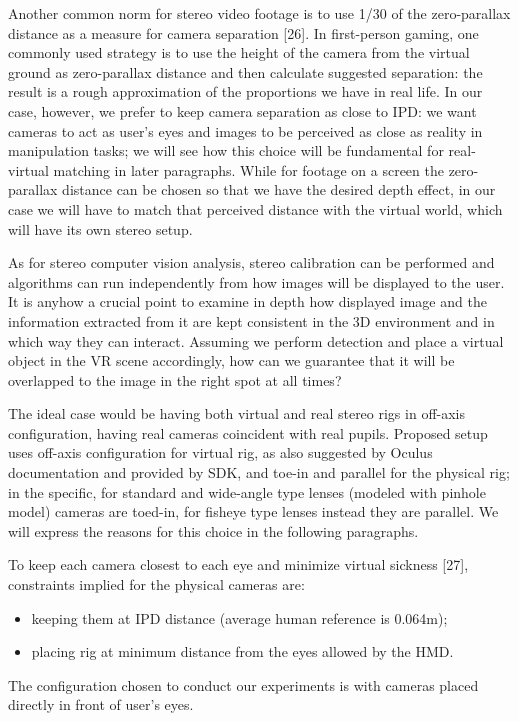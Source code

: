 Another common norm for stereo video footage is to use 1/30 of the zero-parallax distance as a measure for camera separation [26]. In first-person gaming, one commonly used strategy is to use the height of the camera from the virtual ground as zero-parallax distance and then calculate suggested separation: the result is a rough approximation of the proportions we have in real life. In our case, however, we prefer to keep camera separation as close to IPD: we want cameras to act as user's eyes and images to be perceived as close as reality in manipulation tasks; we will see how this choice will be fundamental for real-virtual matching in later paragraphs. While for footage on a screen the zero-parallax distance can be chosen so that we have the desired depth effect, in our case we will have to match that perceived distance with the virtual world, which will have its own stereo setup.

As for stereo computer vision analysis, stereo calibration can be performed and algorithms can run independently from how images will be displayed to the user. It is anyhow a crucial point to examine in depth how displayed image and the information extracted from it are kept consistent in the 3D environment and in which way they can interact. Assuming we perform detection and place a virtual object in the VR scene accordingly, how can we guarantee that it will be overlapped to the image in the right spot at all times?

The ideal case would be having both virtual and real stereo rigs in off-axis configuration, having real cameras coincident with real pupils. Proposed setup uses off-axis configuration for virtual rig, as also suggested by Oculus documentation and provided by SDK, and toe-in and parallel for the physical rig; in the specific, for standard and wide-angle type lenses (modeled with pinhole model) cameras are toed-in, for fisheye type lenses instead they are parallel. We will express the reasons for this choice in the following paragraphs.

To keep each camera closest to each eye and minimize virtual sickness [27], constraints implied for the physical cameras are:
\begin{itemize}
\item keeping them at IPD distance (average human reference is 0.064m);
\item placing rig at minimum distance from the eyes allowed by the HMD.
\end{itemize}
The configuration chosen to conduct our experiments is with cameras placed directly in front of user's eyes.

